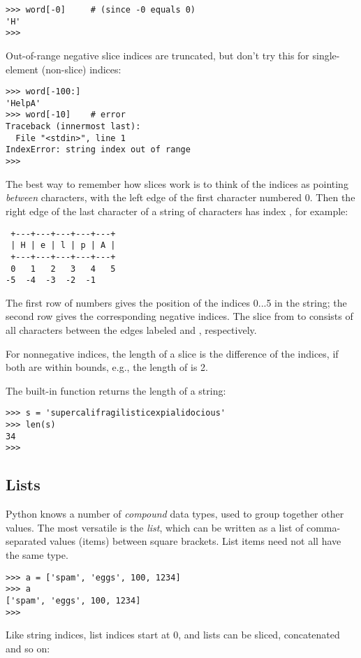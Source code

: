\bcode\begin{verbatim}
>>> word[-0]     # (since -0 equals 0)
'H'
>>>
\end{verbatim}\ecode
%
Out-of-range negative slice indices are truncated, but don't try this
for single-element (non-slice) indices:

\bcode\begin{verbatim}
>>> word[-100:]
'HelpA'
>>> word[-10]    # error
Traceback (innermost last):
  File "<stdin>", line 1
IndexError: string index out of range
>>> 
\end{verbatim}\ecode
%
The best way to remember how slices work is to think of the indices as
pointing \emph{between} characters, with the left edge of the first
character numbered 0.  Then the right edge of the last character of a
string of  characters has index , for example:

\bcode\begin{verbatim}
 +---+---+---+---+---+ 
 | H | e | l | p | A |
 +---+---+---+---+---+ 
 0   1   2   3   4   5 
-5  -4  -3  -2  -1
\end{verbatim}\ecode
%
The first row of numbers gives the position of the indices 0...5 in
the string; the second row gives the corresponding negative indices.
The slice from  to  consists of all characters between
the edges labeled  and , respectively.

For nonnegative indices, the length of a slice is the difference of
the indices, if both are within bounds, e.g., the length of
 is 2.

The built-in function  returns the length of a string:

\bcode\begin{verbatim}
>>> s = 'supercalifragilisticexpialidocious'
>>> len(s)
34
>>> 
\end{verbatim}\ecode

\subsection{Lists}

Python knows a number of \emph{compound} data types, used to group
together other values.  The most versatile is the \emph{list}, which
can be written as a list of comma-separated values (items) between
square brackets.  List items need not all have the same type.

\bcode\begin{verbatim}
>>> a = ['spam', 'eggs', 100, 1234]
>>> a
['spam', 'eggs', 100, 1234]
>>> 
\end{verbatim}\ecode
%
Like string indices, list indices start at 0, and lists can be sliced,
concatenated and so on:

